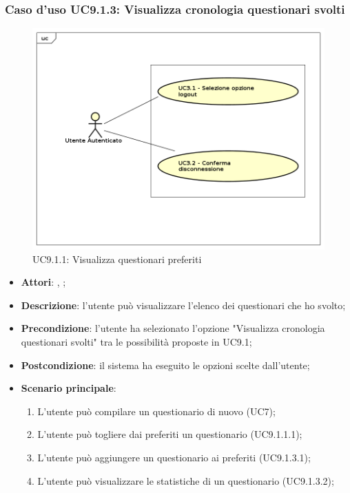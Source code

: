 		\subsubsection{Caso d'uso UC9.1.3: Visualizza cronologia questionari svolti}
		\label{UC9.1.3}
		\begin{figure}[h]
			\centering
			\includegraphics[scale=0.7,keepaspectratio]{UML/UC9.png}
			\caption{UC9.1.1: Visualizza questionari preferiti}
		\end{figure}
		\FloatBarrier
		\begin{itemize}
			\item \textbf{Attori}: \uau, \uaupro;
			\item \textbf{Descrizione}: l'utente può visualizzare l'elenco dei questionari che ho svolto;
			\item \textbf{Precondizione}: l'utente ha selezionato l'opzione "Visualizza cronologia questionari svolti" tra le possibilità proposte in UC9.1;
			\item \textbf{Postcondizione}: il sistema ha eseguito le opzioni scelte dall'utente;
			\item \textbf{Scenario principale}: 
			\begin{enumerate}
				\item L'utente può compilare un questionario di nuovo (UC7);
				\item L'utente può togliere dai preferiti un questionario (UC9.1.1.1);
				\item L'utente può aggiungere un questionario ai preferiti (UC9.1.3.1);
				\item L'utente può visualizzare le statistiche di un questionario (UC9.1.3.2);
			\end{enumerate}
		\end{itemize}
		
